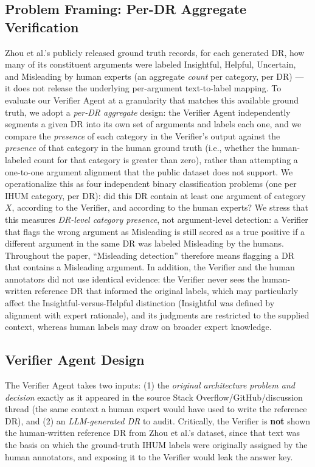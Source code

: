 \documentclass[runningheads]{llncs}
\begin{document}
\subsection{Problem Framing: Per-DR Aggregate Verification}
Zhou et al.'s publicly released ground truth records, for each generated DR, how many of its constituent arguments were labeled Insightful, Helpful, Uncertain, and Misleading by human experts (an aggregate \emph{count} per category, per DR) --- it does not release the underlying per-argument text-to-label mapping. To evaluate our Verifier Agent at a granularity that matches this available ground truth, we adopt a \emph{per-DR aggregate} design: the Verifier Agent independently segments a given DR into its own set of arguments and labels each one, and we compare the \emph{presence} of each category in the Verifier's output against the \emph{presence} of that category in the human ground truth (i.e., whether the human-labeled count for that category is greater than zero), rather than attempting a one-to-one argument alignment that the public dataset does not support. We operationalize this as four independent binary classification problems (one per IHUM category, per DR): did this DR contain at least one argument of category $X$, according to the Verifier, and according to the human experts? We stress that this measures \emph{DR-level category presence}, not argument-level detection: a Verifier that flags the wrong argument as Misleading is still scored as a true positive if a different argument in the same DR was labeled Misleading by the humans. Throughout the paper, ``Misleading detection'' therefore means flagging a DR that contains a Misleading argument. In addition, the Verifier and the human annotators did not use identical evidence: the Verifier never sees the human-written reference DR that informed the original labels, which may particularly affect the Insightful-versus-Helpful distinction (Insightful was defined by alignment with expert rationale), and its judgments are restricted to the supplied context, whereas human labels may draw on broader expert knowledge.

\subsection{Verifier Agent Design}
The Verifier Agent takes two inputs: (1) the \emph{original architecture problem and decision} exactly as it appeared in the source Stack Overflow/GitHub/discussion thread (the same context a human expert would have used to write the reference DR), and (2) an \emph{LLM-generated DR} to audit. Critically, the Verifier is \textbf{not} shown the human-written reference DR from Zhou et al.'s dataset, since that text was the basis on which the ground-truth IHUM labels were originally assigned by the human annotators, and exposing it to the Verifier would leak the answer key.
\end{document}
